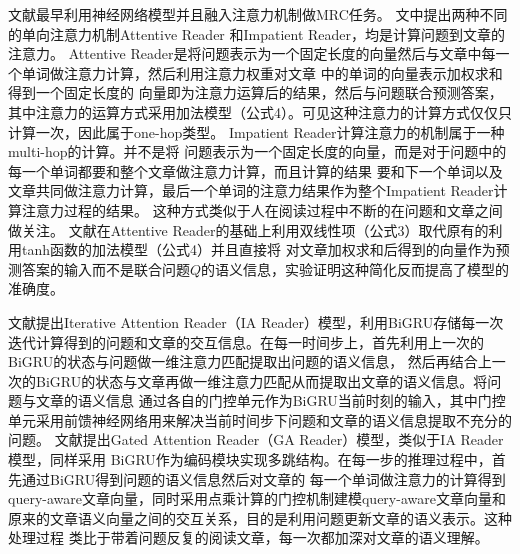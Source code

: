 文献\cite{Hermann}最早利用神经网络模型并且融入注意力机制做MRC任务。
文中提出两种不同的单向注意力机制Attentive Reader
和Impatient Reader，均是计算问题到文章的注意力。
Attentive Reader是将问题表示为一个固定长度的向量然后与文章中每一个单词做注意力计算，然后利用注意力权重对文章
中的单词的向量表示加权求和得到一个固定长度的
向量即为注意力运算后的结果，然后与问题联合预测答案，其中注意力的运算方式采用加法模型（公式4）。可见这种注意力的计算方式仅仅只计算一次，因此属于one-hop类型。
Impatient Reader计算注意力的机制属于一种multi-hop的计算。并不是将
问题表示为一个固定长度的向量，而是对于问题中的每一个单词都要和整个文章做注意力计算，而且计算的结果
要和下一个单词以及文章共同做注意力计算，最后一个单词的注意力结果作为整个Impatient Reader计算注意力过程的结果。
这种方式类似于人在阅读过程中不断的在问题和文章之间做关注。
文献\cite{AR}在Attentive Reader的基础上利用双线性项（公式3）取代原有的利用tanh函数的加法模型（公式4）并且直接将
对文章加权求和后得到的向量作为预测答案的输入而不是联合问题$Q$的语义信息，实验证明这种简化反而提高了模型的准确度。

文献\cite{IAReader}提出Iterative Attention Reader（IA Reader）模型，利用BiGRU存储每一次
迭代计算得到的问题和文章的交互信息。在每一时间步上，首先利用上一次的BiGRU的状态与问题做一维注意力匹配提取出问题的语义信息，
然后再结合上一次的BiGRU的状态与文章再做一维注意力匹配从而提取出文章的语义信息。将问题与文章的语义信息
通过各自的门控单元作为BiGRU当前时刻的输入，其中门控单元采用前馈神经网络用来解决当前时间步下问题和文章的语义信息提取不充分的问题。
文献\cite{GAReader}提出Gated Attention Reader（GA Reader）模型，类似于IA Reader模型，同样采用
BiGRU作为编码模块实现多跳结构。在每一步的推理过程中，首先通过BiGRU得到问题的语义信息然后对文章的
每一个单词做注意力的计算得到query-aware文章向量，同时采用点乘计算的门控机制建模query-aware文章向量和原来的文章语义向量之间的交互关系，目的是利用问题更新文章的语义表示。这种处理过程
类比于带着问题反复的阅读文章，每一次都加深对文章的语义理解。


